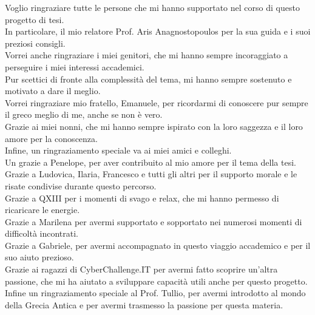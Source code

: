 \documentclass[noexaminfo,oneside,binding=0.6cm]{sapthesis}
\begin{document}
\begin{acknowledgments}
Voglio ringraziare tutte le persone che mi hanno supportato nel corso di questo progetto di tesi. \\
In particolare, il mio relatore Prof. Aris Anagnostopoulos per la sua guida e i suoi preziosi consigli. \\
Vorrei anche ringraziare i miei genitori, che mi hanno sempre incoraggiato a perseguire i miei interessi accademici. \\
Pur scettici di fronte alla complessità del tema, mi hanno sempre sostenuto e motivato a dare il meglio. \\
Vorrei ringraziare mio fratello, Emanuele, per ricordarmi di conoscere pur sempre il greco meglio di me, anche se non è vero. \\
Grazie ai miei nonni, che mi hanno sempre ispirato con la loro saggezza e il loro amore per la conoscenza. \\
Infine, un ringraziamento speciale va ai miei amici e colleghi. \\
Un grazie a Penelope, per aver contribuito al mio amore per il tema della tesi. \\
Grazie a Ludovica, Ilaria, Francesco e tutti gli altri per il supporto morale e le risate condivise durante questo percorso. \\
Grazie a QXIII per i momenti di svago e relax, che mi hanno permesso di ricaricare le energie. \\
Grazie a Marilena per avermi supportato e sopportato nei numerosi momenti di difficoltà incontrati. \\
Grazie a Gabriele, per avermi accompagnato in questo viaggio accademico e per il suo aiuto prezioso. \\
Grazie ai ragazzi di CyberChallenge.IT per avermi fatto scoprire un'altra passione, che mi ha aiutato a sviluppare capacità utili anche per questo progetto. \\
Infine un ringraziamento speciale al Prof. Tullio, per avermi introdotto al mondo della Grecia Antica e per avermi trasmesso la passione per questa materia.
\end{acknowledgments}
\end{document}

